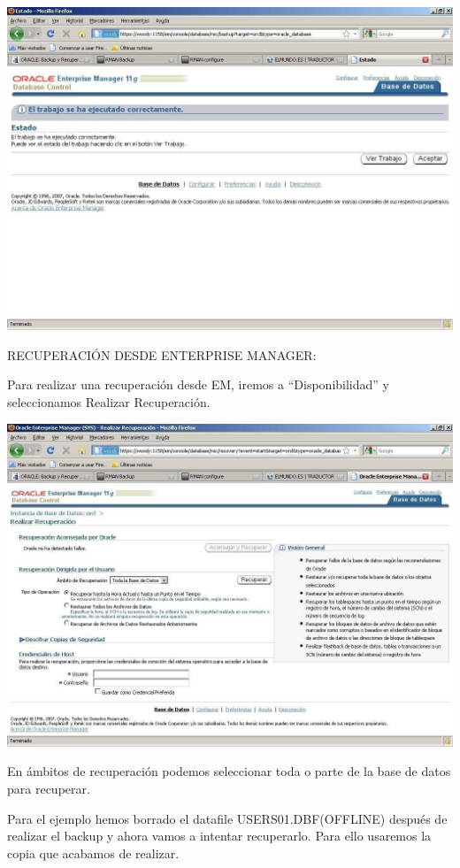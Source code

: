 \documentclass[a4paper,openright,12pt]{book}
\begin{document}
\begin{center}
\includegraphics[width=15cm]{./images/backup/7.jpg}
\end{center}

RECUPERACIÓN  DESDE  ENTERPRISE  MANAGER:

Para realizar una recuperación desde EM, iremos a “Disponibilidad” y seleccionamos
Realizar Recuperación.
\begin{center}
\includegraphics[width=15cm]{./images/backup/8.jpg}
\end{center}
En ámbitos de recuperación podemos seleccionar toda o parte de la base de datos para recuperar.

Para  el  ejemplo  hemos  borrado  el  datafile  USERS01.DBF(OFFLINE)  después  de realizar el backup y ahora vamos a intentar recuperarlo. Para ello usaremos la copia que acabamos de realizar.
\end{document}
